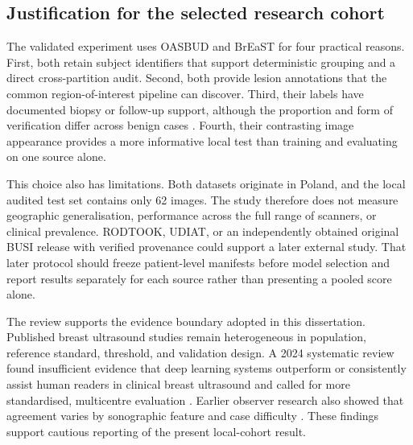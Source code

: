 \subsection{Justification for the selected research cohort}

The validated experiment uses OASBUD and BrEaST for four practical reasons. First, both retain subject identifiers that support deterministic grouping and a direct cross-partition audit. Second, both provide lesion annotations that the common region-of-interest pipeline can discover. Third, their labels have documented biopsy or follow-up support, although the proportion and form of verification differ across benign cases \citep{Piotrzkowska2017,Pawlowska2024,Bristow2026}. Fourth, their contrasting image appearance provides a more informative local test than training and evaluating on one source alone.

This choice also has limitations. Both datasets originate in Poland, and the local audited test set contains only 62 images. The study therefore does not measure geographic generalisation, performance across the full range of scanners, or clinical prevalence. RODTOOK, UDIAT, or an independently obtained original BUSI release with verified provenance could support a later external study. That later protocol should freeze patient-level manifests before model selection and report results separately for each source rather than presenting a pooled score alone.

The review supports the evidence boundary adopted in this dissertation. Published breast ultrasound studies remain heterogeneous in population, reference standard, threshold, and validation design. A 2024 systematic review found insufficient evidence that deep learning systems outperform or consistently assist human readers in clinical breast ultrasound and called for more standardised, multicentre evaluation \citep{Dan2024}. Earlier observer research also showed that agreement varies by sonographic feature and case difficulty \citep{Shimamoto1998}. These findings support cautious reporting of the present local-cohort result.

